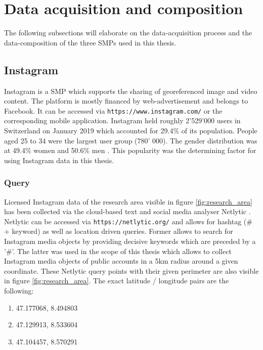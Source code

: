 \section{Data acquisition and composition} \label{data_acquisition}
The following subsections will elaborate on the data-acquisition process and the data-composition of the three SMPs used in this thesis. 

\subsection{Instagram} \label{instagram}
Instagram is a SMP which supports the sharing of georeferenced image and video content. The platform is mostly financed by web-advertisement and belongs to Facebook. It can be accessed via \texttt{https://www.instagram.com/} or the corresponding mobile application.
Instagram held roughly 2'529'000 users in Switzerland on January 2019 which accounted for 29.4\% of its population. People aged 25 to 34 were the largest user group (780' 000). The gender distribution was at 49.4\% women and 50.6\% men \parencite{2013}. This popularity was the determining factor for using Instagram data in this thesis.\\

\subsubsection*{Query} \label{netlytic}
Licensed Instagram data of the research area visible in figure \ref{fig:research_area} has been collected via the cloud-based text and social media analyser Netlytic \parencite{Gruzd2016}. Netlytic can be accessed via \texttt{https://netlytic.org/} and allows for hashtag (\# + keyword) as well as location driven queries. Former allows to search for Instagram media objects by providing decisive keywords which are preceded by a '\#'. The latter was used in the scope of this thesis which allows to collect Instagram media objects of public accounts in a 5km radius around a given coordinate. These Netlytic query points with their given perimeter are also visible in figure \ref{fig:research_area}. The exact latitude / longitude pairs are the following:\\
\begin{enumerate}
  \item 47.177068, 8.494803
  \item 47.129913, 8.533604
  \item 47.104457, 8.570291
\end{enumerate}


